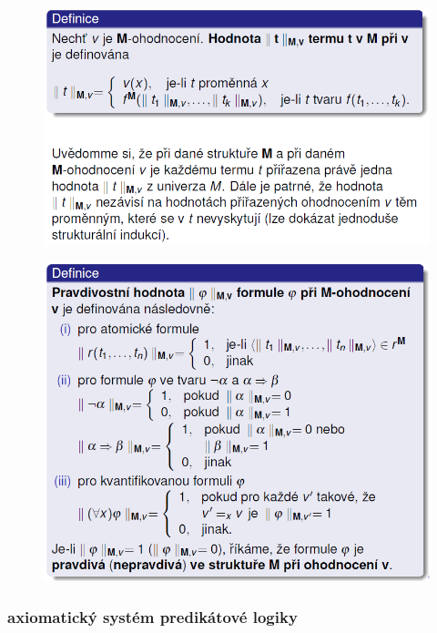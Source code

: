\documentclass[10pt,a4paper]{article}
\theoremstyle{note}
\begin{document}
			\begin{figure}[H]
			\centering
			\includegraphics[width=13cm]{img/mOhodnoceni.png}
			\end{figure}

			\begin{figure}[H]
			\centering
			\includegraphics[width=13cm]{img/ohodnoceniFormuliPL.png}
			\end{figure}

		\subsubsection{axiomatický systém predikátové logiky}
\end{document}
